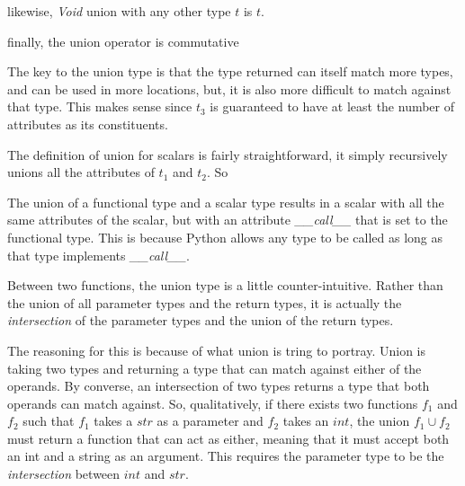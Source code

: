 \documentclass{scrartcl}
\begin{document}
\begin{multicols}{2}

likewise, \emph{Void} union with any other type $t$ is $t$.


finally, the union operator is commutative


The key to the union type is that the type returned can itself match more
types, and can be used in more locations, but, it is also more difficult
to match against that type. This makes sense since $t_3$ is guaranteed
to have at least the number of attributes as its constituents.

The definition of union for scalars is fairly straightforward, it simply
recursively unions all the attributes of $t_1$ and $t_2$. So


The union of a functional type and a scalar type results in a scalar with all
the same attributes of the scalar, but with an attribute \emph{\_\_call\_\_}
that is set to the functional type. This is because Python allows any type to
be called as long as that type implements \emph{\_\_call\_\_}.


Between two functions, the union type is a little counter-intuitive. Rather
than the union of all parameter types and the return types, it is actually the
\emph{intersection} of the parameter types and the union of the return types.


The reasoning for this is because of what union is tring to portray. Union
is taking two types and returning a type that can match against either of
the operands.  By converse, an intersection of two types returns a type
that both operands can match against. So, qualitatively, if there
exists two functions $f_1$ and $f_2$ such that $f_1$ takes a $str$
as a parameter and $f_2$ takes an $int$, the union $f_1\cup f_2$ must
return a function that can act as either, meaning that it must accept
both an int and a string as an argument. This requires the parameter type to
be the \emph{intersection} between $int$ and $str$.


\end{multicols}
\end{document}
